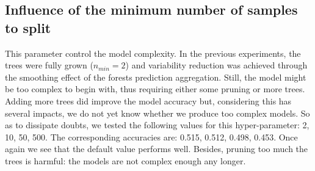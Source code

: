 \documentclass[a4paper]{report}
\begin{document}
		\subsection{Influence of the minimum number of samples to split}
		This parameter control the model complexity. In the previous experiments, the trees were fully grown ($n_{min} = 2$) and variability reduction was achieved through the smoothing effect of the forests prediction aggregation. Still, the model might be too complex to begin with, thus requiring either some pruning or more trees. Adding more trees did improve the model accuracy but, considering this has several impacts, we do not yet know whether we produce too complex models. So as to dissipate doubts, we tested the following values for this hyper-parameter: 2, 10, 50, 500. The corresponding accuracies are: 0.515, 0.512, 0.498, 0.453. Once again we see that the default value performs well. Besides, pruning too much the trees is harmful: the models are not complex enough any longer.
		
\end{document}
